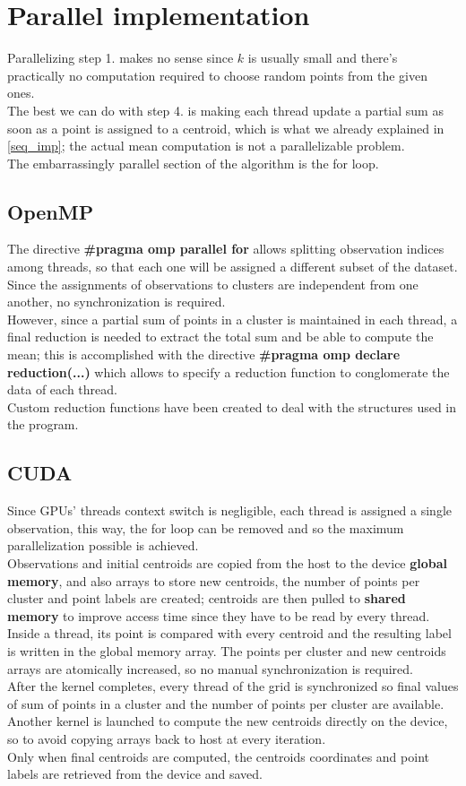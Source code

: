 \documentclass[10pt,twocolumn,letterpaper]{article}
\begin{document}
\section{Parallel implementation}
Parallelizing step 1. makes no sense since $k$ is usually small and there's practically no computation required to choose random points from the given ones.\\
The best we can do with step 4. is making each thread update a partial sum as soon as a point is assigned to a centroid, which is what we already explained in \cref{seq_imp}; the actual mean computation is not a parallelizable problem.\\
The embarrassingly parallel section of the algorithm is the for loop.
\subsection{OpenMP}
The directive \textbf{\#pragma omp parallel for} allows splitting observation indices among threads, so that each one will be assigned a different subset of the dataset.\\
Since the assignments of observations to clusters are independent from one another, no synchronization is required.\\
However, since a partial sum of points in a cluster is maintained in each thread, a final reduction is needed to extract the total sum and be able to compute the mean; this is accomplished with the directive \textbf{\#pragma omp declare reduction(...)} which allows to specify a reduction function to conglomerate the data of each thread.\\
Custom reduction functions have been created to deal with the structures used in the program.
\subsection{CUDA}
Since GPUs' threads context switch is negligible, each thread is assigned a single observation, this way, the for loop can be removed and so the maximum parallelization possible is achieved.\\
Observations and initial centroids are copied from the host to the device \textbf{global memory}, and also arrays to store new centroids, the number of points per cluster and point labels are created; centroids are then pulled to \textbf{shared memory} to improve access time since they have to be read by every thread.\\
Inside a thread, its point is compared with every centroid and the resulting label is written in the global memory array. The points per cluster and new centroids arrays are atomically increased, so no manual synchronization is required.\\
After the kernel completes, every thread of the grid is synchronized so final values of sum of points in a cluster and the number of points per cluster are available.
Another kernel is launched to compute the new centroids directly on the device, so to avoid copying arrays back to host at every iteration.\\
Only when final centroids are computed, the centroids coordinates and point labels are retrieved from the device and saved.
\end{document}
